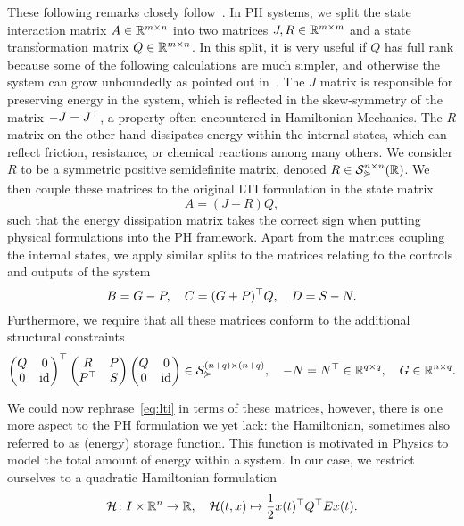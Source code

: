 These following remarks closely follow~\cite[Definition~4.9]{Mehrmann2023}.
In \ac{PH} systems, we split the state interaction matrix $A \in \mathbb{R}^{m \times n}$ into two matrices $J, R \in \mathbb{R}^{m \times m}$ and a state transformation matrix $Q \in \mathbb{R}^{m \times n}$.
In this split, it is very useful if $Q$ has full rank because some of the following calculations are much simpler, and otherwise the system can grow unboundedly as pointed out in~\cite[Remark~4.10]{Mehrmann2023}.
The $J$ matrix is responsible for preserving energy in the system, which is reflected in the skew-symmetry of the matrix $-J = J^{\top}$, a property often encountered in Hamiltonian Mechanics.
The $R$ matrix on the other hand dissipates energy within the internal states, which can reflect friction, resistance, or chemical reactions among many others.
We consider $R$ to be a symmetric positive semidefinite matrix, denoted $R \in \mathcal{S}_{\curlyeqsucc}^{n \times n}(\mathbb{R})$.
We then couple these matrices to the original \ac{LTI} formulation in the state matrix
\begin{equation*}
    A = (J - R)Q,
\end{equation*}
such that the energy dissipation matrix takes the correct sign when putting physical formulations into the \ac{PH} framework.
Apart from the matrices coupling the internal states, we apply similar splits to the matrices relating to the controls and outputs of the system
\begin{equation*}
    B = G - P,\quad C = (G + P)^{\top} Q,\quad D = S - N.
\end{equation*}
Furthermore, we require that all these matrices conform to the additional structural constraints
\begin{equation*}
    \begin{pmatrix}
        Q & 0 \\
        0 & \text{id}_{}
    \end{pmatrix}^{\top}
    \begin{pmatrix}
        R & P \\
        P^{\top} & S
    \end{pmatrix}
    \begin{pmatrix}
        Q & 0 \\
        0 & \text{id}_{}
    \end{pmatrix}
    \in \mathcal{S}_{\curlyeqsucc}^{(n + q) \times (n + q)},\quad -N = N^{\top} \in \mathbb{R}^{q \times q},\quad G \in \mathbb{R}^{n \times q}.
\end{equation*}

We could now rephrase~\eqref{eq:lti} in terms of these matrices, however, there is one more aspect to the \ac{PH} formulation we yet lack: the Hamiltonian, sometimes also referred to as (energy) storage function.
This function is motivated in Physics to model the total amount of energy within a system.
In our case, we restrict ourselves to a quadratic Hamiltonian formulation
\begin{equation}\label{eq:quadratic-hamiltonian}
    \mathcal{H} \colon I \times \mathbb{R}^{n} \to \mathbb{R},\quad \mathcal{H}(t, x) \mapsto \frac{1}{2} x(t)^{\top} Q^{\top} E x(t).
\end{equation}

